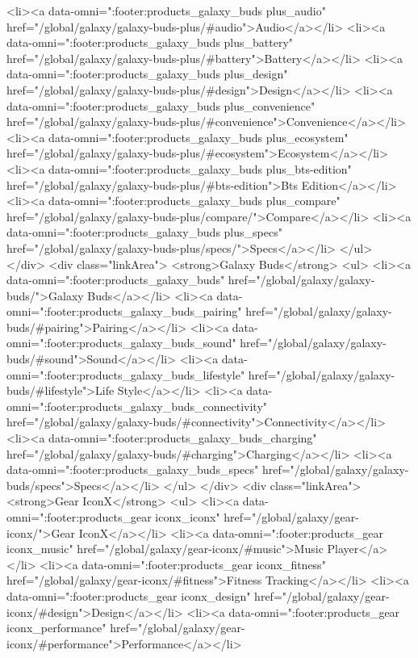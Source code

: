{{{{{{{{{{{{{{{{{{{{{{{{{{{{{{{{{{{{{{{{{{{{{{{{{{{{{				<li><a data-omni=":footer:products_galaxy_buds plus_audio" href="/global/galaxy/galaxy-buds-plus/#audio">Audio</a></li>
				<li><a data-omni=":footer:products_galaxy_buds plus_battery" href="/global/galaxy/galaxy-buds-plus/#battery">Battery</a></li>
				<li><a data-omni=":footer:products_galaxy_buds plus_design" href="/global/galaxy/galaxy-buds-plus/#design">Design</a></li>
				<li><a data-omni=":footer:products_galaxy_buds plus_convenience" href="/global/galaxy/galaxy-buds-plus/#convenience">Convenience</a></li>
				<li><a data-omni=":footer:products_galaxy_buds plus_ecosystem" href="/global/galaxy/galaxy-buds-plus/#ecosystem">Ecosystem</a></li>
				<li><a data-omni=":footer:products_galaxy_buds plus_bts-edition" href="/global/galaxy/galaxy-buds-plus/#bts-edition">Bts Edition</a></li>
				<li><a data-omni=":footer:products_galaxy_buds plus_compare" href="/global/galaxy/galaxy-buds-plus/compare/">Compare</a></li>
				<li><a data-omni=":footer:products_galaxy_buds plus_specs" href="/global/galaxy/galaxy-buds-plus/specs/">Specs</a></li>
			</ul>
		</div>
		<div class="linkArea">
			<strong>Galaxy Buds</strong>
			<ul>
				<li><a data-omni=":footer:products_galaxy_buds" href="/global/galaxy/galaxy-buds/">Galaxy Buds</a></li>
				<li><a data-omni=":footer:products_galaxy_buds_pairing" href="/global/galaxy/galaxy-buds/#pairing">Pairing</a></li>
				<li><a data-omni=":footer:products_galaxy_buds_sound" href="/global/galaxy/galaxy-buds/#sound">Sound</a></li>
				<li><a data-omni=":footer:products_galaxy_buds_lifestyle" href="/global/galaxy/galaxy-buds/#lifestyle">Life Style</a></li>
				<li><a data-omni=":footer:products_galaxy_buds_connectivity" href="/global/galaxy/galaxy-buds/#connectivity">Connectivity</a></li>
				<li><a data-omni=":footer:products_galaxy_buds_charging" href="/global/galaxy/galaxy-buds/#charging">Charging</a></li>
				<li><a data-omni=":footer:products_galaxy_buds_specs" href="/global/galaxy/galaxy-buds/specs">Specs</a></li>
			</ul>
		</div>
		<div class="linkArea">
			<strong>Gear IconX</strong>
			<ul>
				<li><a data-omni=":footer:products_gear iconx_iconx" href="/global/galaxy/gear-iconx/">Gear IconX</a></li>
				<li><a data-omni=":footer:products_gear iconx_music" href="/global/galaxy/gear-iconx/#music">Music Player</a></li>
				<li><a data-omni=":footer:products_gear iconx_fitness" href="/global/galaxy/gear-iconx/#fitness">Fitness Tracking</a></li>
				<li><a data-omni=":footer:products_gear iconx_design" href="/global/galaxy/gear-iconx/#design">Design</a></li>
				<li><a data-omni=":footer:products_gear iconx_performance" href="/global/galaxy/gear-iconx/#performance">Performance</a></li>
}}}}}}}}}}}}}}}}}}}}}}}}}}}}}}}}}}}}}}}}}}}}}}}}}}}}}

